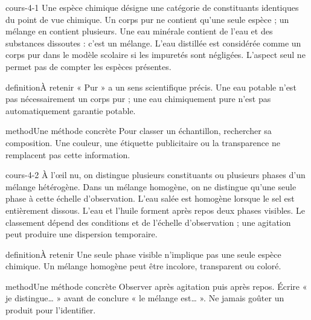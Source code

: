 \documentclass[12pt,twoside,openany]{book}
\begin{document}
\begin{pcFiche}{cours-4-1}
Une espèce chimique désigne une catégorie de constituants identiques du point de vue chimique. Un corps pur ne contient qu’une seule espèce ; un mélange en contient plusieurs. Une eau minérale contient de l’eau et des substances dissoutes : c’est un mélange. L’eau distillée est considérée comme un corps pur dans le modèle scolaire si les impuretés sont négligées. L’aspect seul ne permet pas de compter les espèces présentes.\par
{}
\begin{pcEncadre}{definition}{À retenir}
« Pur » a un sens scientifique précis. Une eau potable n’est pas nécessairement un corps pur ; une eau chimiquement pure n’est pas automatiquement garantie potable.\par
\end{pcEncadre}
\begin{pcEncadre}{method}{Une méthode concrète}
Pour classer un échantillon, rechercher sa composition. Une couleur, une étiquette publicitaire ou la transparence ne remplacent pas cette information.\par
\end{pcEncadre}
\end{pcFiche}
\label{ch-4-cours-2}
\begin{pcFiche}{cours-4-2}
À l’œil nu, on distingue plusieurs constituants ou plusieurs phases d’un mélange hétérogène. Dans un mélange homogène, on ne distingue qu’une seule phase à cette échelle d’observation. L’eau salée est homogène lorsque le sel est entièrement dissous. L’eau et l’huile forment après repos deux phases visibles. Le classement dépend des conditions et de l’échelle d’observation ; une agitation peut produire une dispersion temporaire.\par
{}
\begin{pcEncadre}{definition}{À retenir}
Une seule phase visible n’implique pas une seule espèce chimique. Un mélange homogène peut être incolore, transparent ou coloré.\par
\end{pcEncadre}
\begin{pcEncadre}{method}{Une méthode concrète}
Observer après agitation puis après repos. Écrire « je distingue… » avant de conclure « le mélange est… ». Ne jamais goûter un produit pour l’identifier.\par
\end{pcEncadre}
\end{pcFiche}
\end{document}
